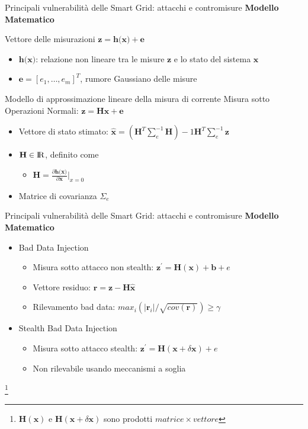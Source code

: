 \begin{frame}{Principali vulnerabilità delle Smart Grid: attacchi e contromisure}
\textbf{Modello Matematico}
	\begin{block}{Vettore delle misurazioni} %
		$\textbf{z} = \textbf{h(x)} + \textbf{e}$
		\begin{itemize}
			\item $\textbf{h(x)}$: relazione non lineare tra le misure $\textbf{z}$ e lo stato del sistema $\textbf{x}$
			\item $\textbf{e} = [e_1, \ldots, e_m]^T$, rumore Gaussiano delle misure
		\end{itemize}
	\end{block}
	\pause
	\begin{block}{Modello di approssimazione lineare della misura di corrente}
		Misura sotto Operazioni Normali: $\textbf{z} =  \textbf{Hx} + \textbf{e}$
		\begin{itemize}
			\item Vettore di stato stimato: $\widehat{\textbf{x}} = (\textbf{H}^T\sum_e^{-1}\textbf{H})-1\textbf{H}^T\sum_e^{-1}\textbf{z}$
			\item $\textbf{H} \in {\rm I\!R}$, definito come
			\begin{itemize}
				\item $\textbf{H}=\frac{\partial\textbf{h(x)}}{\partial\textbf{x}}|_{x=0}$
			\end{itemize}
			\item Matrice di covarianza $\Sigma_e$
		\end{itemize}
	\end{block}
\end{frame}

\begin{frame}{Principali vulnerabilità delle Smart Grid: attacchi e contromisure}
	\textbf{Modello Matematico}
	\begin{itemize}
	\item Bad Data Injection
	\begin{itemize}
		\item Misura sotto attacco non stealth: $\textbf{z}^\prime = \textbf{H}(\textbf{x}) + \textbf{b} + e$
		\item Vettore residuo: $\textbf{r} = \textbf{z} - \textbf{H}\widehat{\textbf{x}}$
		\item Rilevamento bad data: $max_i(|\textbf{r}_i|/\sqrt{cov(\textbf{r})}) \geq \gamma$
	\end{itemize}
	\item Stealth Bad Data Injection
	\begin{itemize}
		\item Misura sotto attacco stealth: $\textbf{z}^\prime = \textbf{H}(\textbf{x} + \delta\textbf{x}) + e$
		\item Non rilevabile usando meccanismi a soglia
	\end{itemize}
\end{itemize}
\let\thefootnote\relax\footnote{$\textbf{H}(\textbf{x})$ e $\textbf{H}(\textbf{x} + \delta\textbf{x})$ sono prodotti $matrice \times vettore$}
\end{frame}

